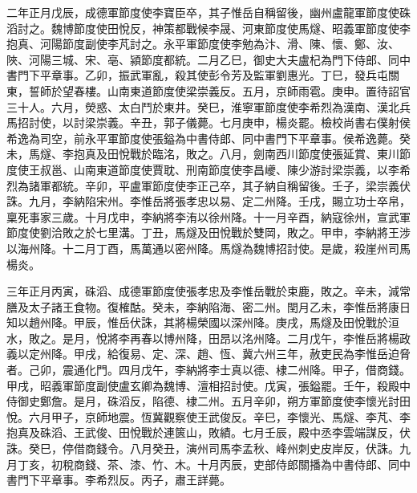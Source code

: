\begin{pinyinscope}
 二年正月戊辰，成德軍節度使李寶臣卒，其子惟岳自稱留後，幽州盧龍軍節度使硃滔討之。魏博節度使田悅反，神策都戰候李晟、河東節度使馬燧、昭義軍節度使李抱真、河陽節度副使李芃討之。永平軍節度使李勉為汴、滑、陳、懷、鄭、汝、陜、河陽三城、宋、亳、潁節度都統。二月乙巳，御史大夫盧杞為門下侍郎、同中書門下平章事。乙卯，振武軍亂，殺其使彭令芳及監軍劉惠光。丁巳，發兵屯關東，誓師於望春樓。山南東道節度使梁崇義反。五月，京師雨雹。庚申。置待詔官三十人。六月，熒惑、太白鬥於東井。癸巳，淮寧軍節度使李希烈為漢南、漢北兵馬招討使，以討梁崇義。辛丑，郭子儀薨。七月庚申，楊炎罷。檢校尚書右僕射侯希逸為司空，前永平軍節度使張鎰為中書侍郎、同中書門下平章事。侯希逸薨。癸未，馬燧、李抱真及田悅戰於臨洺，敗之。八月，劍南西川節度使張延賞、東川節度使王叔邕、山南東道節度使賈耽、刑南節度使李昌巙、陳少游討梁崇義，以李希烈為諸軍都統。辛卯，平盧軍節度使李正己卒，其子納自稱留後。壬子，梁崇義伏誅。九月，李納陷宋州。李惟岳將張孝忠以易、定二州降。壬戌，賜立功士卒帛，稟死事家三歲。十月戊申，李納將李洧以徐州降。十一月辛酉，納寇徐州，宣武軍節度使劉洽敗之於七里溝。丁丑，馬燧及田悅戰於雙岡，敗之。甲申，李納將王涉以海州降。十二月丁酉，馬萬通以密州降。馬燧為魏博招討使。是歲，殺崖州司馬楊炎。



 三年正月丙寅，硃滔、成德軍節度使張孝忠及李惟岳戰於束鹿，敗之。辛未，減常膳及太子諸王食物。復榷酤。癸未，李納陷海、密二州。閏月乙未，李惟岳將康日知以趙州降。甲辰，惟岳伏誅，其將楊榮國以深州降。庚戌，馬燧及田悅戰於洹水，敗之。是月，悅將李再春以博州降，田昂以洺州降。二月戊午，李惟岳將楊政義以定州降。甲戌，給復易、定、深、趙、恆、冀六州三年，赦吏民為李惟岳迫脅者。己卯，震通化門。四月戊午，李納將李士真以德、棣二州降。甲子，借商錢。甲戌，昭義軍節度副使盧玄卿為魏博、澶相招討使。戊寅，張鎰罷。壬午，殺殿中侍御史鄭詹。是月，硃滔反，陷德、棣二州。五月辛卯，朔方軍節度使李懷光討田悅。六月甲子，京師地震。恆冀觀察使王武俊反。辛巳，李懷光、馬燧、李芃、李抱真及硃滔、王武俊、田悅戰於連篋山，敗績。七月壬辰，殿中丞李雲端謀反，伏誅。癸巳，停借商錢令。八月癸丑，演州司馬李孟秋、峰州刺史皮岸反，伏誅。九月丁亥，初稅商錢、茶、漆、竹、木。十月丙辰，吏部侍郎關播為中書侍郎、同中書門下平章事。李希烈反。丙子，肅王詳薨。




\end{pinyinscope}
